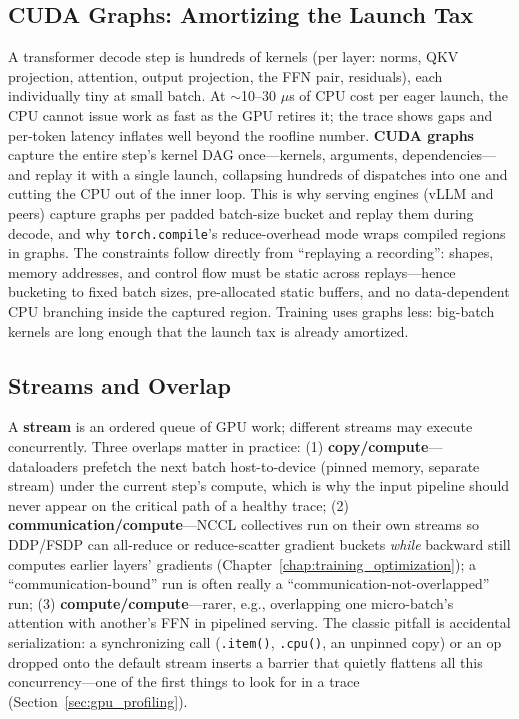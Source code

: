 \subsection{CUDA Graphs: Amortizing the Launch Tax}

A transformer decode step is hundreds of kernels (per layer: norms, QKV projection, attention, output projection, the FFN pair, residuals), each individually tiny at small batch. At $\sim$10--30 $\mu$s of CPU cost per eager launch, the CPU cannot issue work as fast as the GPU retires it; the trace shows gaps and per-token latency inflates well beyond the roofline number. \textbf{CUDA graphs} capture the entire step's kernel DAG once---kernels, arguments, dependencies---and replay it with a single launch, collapsing hundreds of dispatches into one and cutting the CPU out of the inner loop. This is why serving engines (vLLM and peers) capture graphs per padded batch-size bucket and replay them during decode, and why \texttt{torch.compile}'s reduce-overhead mode wraps compiled regions in graphs. The constraints follow directly from ``replaying a recording'': shapes, memory addresses, and control flow must be static across replays---hence bucketing to fixed batch sizes, pre-allocated static buffers, and no data-dependent CPU branching inside the captured region. Training uses graphs less: big-batch kernels are long enough that the launch tax is already amortized.

\subsection{Streams and Overlap}

A \textbf{stream} is an ordered queue of GPU work; different streams may execute concurrently. Three overlaps matter in practice: (1) \textbf{copy/compute}---dataloaders prefetch the next batch host-to-device (pinned memory, separate stream) under the current step's compute, which is why the input pipeline should never appear on the critical path of a healthy trace; (2) \textbf{communication/compute}---NCCL collectives run on their own streams so DDP/FSDP can all-reduce or reduce-scatter gradient buckets \textit{while} backward still computes earlier layers' gradients (Chapter~\ref{chap:training_optimization}); a ``communication-bound'' run is often really a ``communication-not-overlapped'' run; (3) \textbf{compute/compute}---rarer, e.g., overlapping one micro-batch's attention with another's FFN in pipelined serving. The classic pitfall is accidental serialization: a synchronizing call (\texttt{.item()}, \texttt{.cpu()}, an unpinned copy) or an op dropped onto the default stream inserts a barrier that quietly flattens all this concurrency---one of the first things to look for in a trace (Section~\ref{sec:gpu_profiling}).

